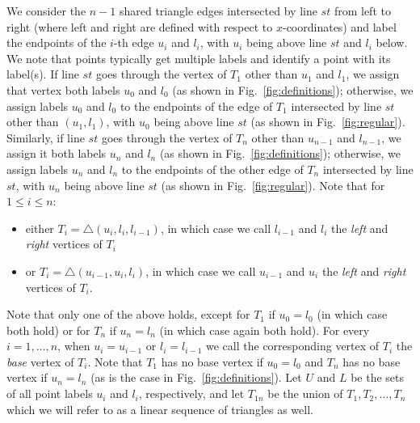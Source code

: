 We consider the $n-1$ shared triangle edges intersected by line $st$ from left
to right (where left and right are defined with respect to $x$-coordinates)
and label the endpoints of the $i$-th edge $u_i$ and $l_i$, with
$u_i$ being above line $st$ and $l_i$ below. We note that points typically get
multiple labels and identify a point with its label(s). 
If line $st$ goes through the vertex of $T_1$ other than $u_1$ and $l_1$,
we assign that vertex both labels $u_0$ and $l_0$ (as shown in
Fig.~\ref{fig:definitions}); otherwise, we assign labels
$u_0$ and $l_0$ to the endpoints of the edge of $T_1$ intersected by line $st$
other than $(u_1,l_1)$, with $u_0$ being above line $st$ (as shown in
Fig.~\ref{fig:regular}). Similarly, if line 
$st$ goes through the vertex of $T_n$ other than $u_{n-1}$ and $l_{n-1}$, 
we assign it both labels $u_n$ and $l_n$ (as shown in
Fig.~\ref{fig:definitions}); otherwise, we assign labels 
$u_n$ and $l_n$ to the endpoints of the other edge of $T_n$ intersected by
line $st$, with $u_n$ being above line $st$ (as shown in
Fig.~\ref{fig:regular}). Note that for $1 \leq i \leq n$:
\begin{itemize}
\item either $T_i = \triangle(u_i, l_i, l_{i-1})$, in which case we call
$l_{i-1}$ and $l_i$ the {\em left} and {\em right} vertices of $T_i$ 
\item or $T_i = \triangle(u_{i-1}, u_i, l_i)$, in which case we call $u_{i-1}$
and $u_i$ the {\em left} and {\em right} vertices of $T_i$.
\end{itemize}
Note that only one of the above holds, except for $T_1$ if $u_0=l_0$
(in which case both hold) or for $T_n$ if $u_n=l_n$ (in which case again both
hold). For every $i = 1, \dots, n$,
when $u_i = u_{i-1}$ or $l_i = l_{i-1}$ we call the corresponding vertex of $T_i$
the {\em base} vertex of $T_i$. Note that $T_1$ has no base vertex if $u_0=l_0$
and $T_n$ has no base vertex if $u_n=l_n$ (as is the case in 
Fig.~\ref{fig:definitions}). Let $U$ and $L$ be the sets of all point labels
$u_i$ and $l_i$, respectively, and let $T_{1n}$ be the union of
$T_1,T_2,\dotsc,T_{n}$ which we will refer to as a linear sequence of triangles
as well.

